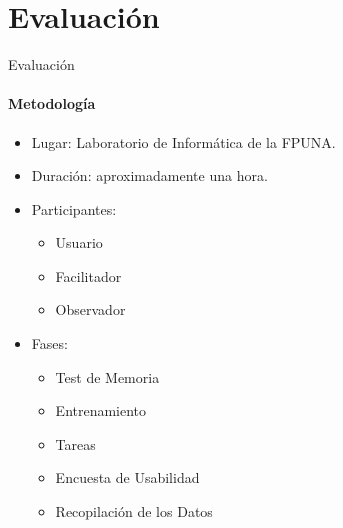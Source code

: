 \section{Evaluaci\'on}

\begin{frame}{Evaluaci\'on}
\framesubtitle{Metodolog\'ia}


\begin{itemize}
    \vfill \item<+->{ Lugar: Laboratorio de Inform\'atica de la FPUNA.}
    \vfill \item<+->{ Duraci\'on: aproximadamente una hora. } 
    \vfill \item<+->{ Participantes:}
        \begin{itemize}
            \vfill \item<+->{ Usuario }
            \vfill \item<+->{ Facilitador }
            \vfill \item<+->{ Observador }
        \end{itemize}
    \vfill \item<+->{ Fases: }
        \begin{itemize}
            \vfill \item<+->{ Test de Memoria }
            \vfill \item<+->{ Entrenamiento }
            \vfill \item<+->{ Tareas }
            \vfill \item<+->{ Encuesta de Usabilidad }
            \vfill \item<+->{ Recopilaci\'on de los Datos }
        \end{itemize}   
\end{itemize}
\end{frame}


